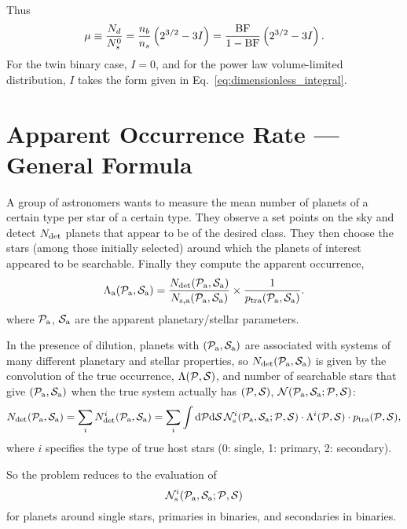 \documentclass[12pt,modern]{aastex61}
\begin{document}
Thus
\begin{equation}
\mu \equiv \frac{N_d}{N_s^0}
= \frac{n_b}{n_s} \left(2^{3/2} - 3 I\right)
= \frac{{\rm BF}}{1 - {\rm BF}} \left(2^{3/2} - 3 I\right).
\label{eq:mu_final}
\end{equation}
For the twin binary case, $I=0$, and for the power law volume-limited 
distribution, $I$ takes the form given in Eq.~\ref{eq:dimensionless_integral}.


\section{Apparent Occurrence Rate --- General Formula}

A group of astronomers wants to measure the mean number of planets of a 
certain type per star of a certain type.
They observe a set points on the sky and detect $N_{\rm det}$ planets that 
appear to be of the desired class.
They then choose the stars (among those initially selected) around which the 
planets of interest appeared to be searchable.
Finally they compute the apparent occurrence,
\begin{equation}
\Lambda\a(\pp\a, \ps\a) = \frac{N_{\rm det}(\pp\a, \ps\a)}{N_{\rm s,a}(\pp\a, 
    \ps\a)} \times \frac{1}{p_{\rm tra}(\pp\a, \ps\a)}.
\end{equation}
where $\mathcal{P}_{\rm a}$, $\mathcal{S}_{\rm a}$ are the apparent planetary/stellar parameters.

In the presence of dilution, planets with $(\mathcal{P}_{\rm a}, \mathcal{S}_{\rm a})$ are associated with 
systems of many different planetary and stellar properties, so $N_{\rm 
det}(\mathcal{P}_{\rm a}, \mathcal{S}_{\rm a})$ is 
given by the convolution of the true occurrence, $\Lambda(\mathcal{P}, \mathcal{S})$, and 
number of searchable stars that give $(\mathcal{P}_{\rm a}, \mathcal{S}_{\rm a})$ when the true system 
actually has $(\mathcal{P}, \mathcal{S})$, $\mathcal{N}(\mathcal{P}_{\rm a}, \mathcal{S}_{\rm a}; \mathcal{P}, \mathcal{S})$:
\begin{equation}
	N_{\rm det}(\pp\a, \ps\a)=\sum_i N_{\rm det}^i(\pp\a, \ps\a)
	=\sum_i \int \mathrm{d}\pp\mathrm{d}\ps\,
	\mathcal{N}_{\rm s}^i(\pp\a,\ps\a; \pp, \ps)
	\cdot\Lambda^i(\pp, \ps)\cdot p_{\rm tra}(\pp, \ps),
\end{equation}
where $i$ specifies the type of true host stars (0: single, 1: primary, 2: 
secondary).

So the problem reduces to the evaluation of
\begin{equation}
	\mathcal{N}_{\rm s}^i(\pp\a,\ps\a; \pp, \ps)
\end{equation}
for planets around single stars, primaries in binaries, and secondaries in binaries. 
\end{document}
